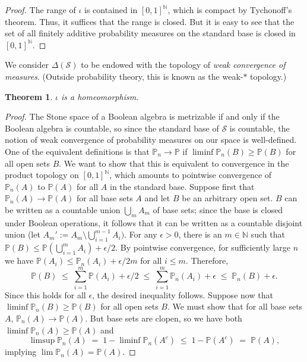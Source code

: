 \documentclass[12pt]{article}
\newcommand{\NN}{\mathbb{N}}
\newcommand{\cS}{\mathcal{S}}
\theoremstyle{plain}
\newtheorem{theorem}{Theorem}[subsection]
\theoremstyle{definition}
\theoremstyle{remark}
\begin{document}
\begin{proof}
The range of $\iota$ is contained in $[0,1]^\NN$, which is compact by Tychonoff's theorem. Thus, it suffices that the range is closed. But it is easy to see that the set of all finitely additive probability measures on the standard base is closed in $[0,1]^\NN$.
\end{proof}
We consider $\Delta(\cS)$ to be endowed with the topology of \emph{weak convergence of measures}. (Outside probability theory, this is known as the weak-$*$ topology.)
\begin{theorem}
$\iota$ is a homeomorphism.
\end{theorem}
\begin{proof}
The Stone space of a Boolean algebra is metrizable if and only if the Boolean algebra is countable, so since the standard base of $\cS$ is countable, the notion of weak convergence of probability measures on our space is well-defined. One of the equivalent definitions is that $\mathbb{P}_n\to\mathbb{P}$ if $\liminf\mathbb{P}_n(B)\ge\mathbb{P}(B)$ for all open sets $B$. We want to show that this is equivalent to convergence in the product topology on $[0,1]^\NN$, which amounts to pointwise convergence of $\mathbb{P}_n(A)$ to $\mathbb{P}(A)$ for all $A$ in the standard base.
Suppose first that $\mathbb{P}_n(A)\to\mathbb{P}(A)$ for all base sets $A$ and let $B$ be an arbitrary open set. $B$ can be written as a countable union $\textstyle\bigcup_m A_m$ of base sets; since the base is closed under Boolean operations, it follows that it can be written as a countable disjoint union (let $\textstyle A_m' := A_m\setminus\bigcup_{i=1}^{m-1}A_i)$. For any $\epsilon>0$, there is an $m\in\mathbb{N}$ such that $\textstyle\mathbb{P}(B)\le\mathbb{P}(\bigcup_{i=1}^m A_i)+\epsilon/2$. By pointwise convergence, for sufficiently large $n$ we have $\mathbb{P}(A_i)\le\mathbb{P}_n(A_i) + \epsilon/2m$ for all $i\le m$. Therefore,
\[
\textstyle\mathbb{P}(B)\;\le\;\sum_{i=1}^m\mathbb{P}(A_i)+\epsilon/2\;\le\;\sum_{i=1}^m\mathbb{P}_n(A_i) + \epsilon\;\le\;\mathbb{P}_n(B)+\epsilon.
\]
Since this holds for all $\epsilon$, the desired inequality follows.
Suppose now that $\liminf\mathbb{P}_n(B)\ge\mathbb{P}(B)$ for all open sets $B$. We must show that for all base sets $A$, $\mathbb{P}_n(A)\to\mathbb{P}(A)$. But base sets are clopen, so we have both $\liminf\mathbb{P}_n(A)\ge\mathbb{P}(A)$ and
\[
\limsup\mathbb{P}_n(A) \;=\; 1-\liminf\mathbb{P}_n(A^c) \;\le\; 1 - \mathbb{P}(A^c) \;=\; \mathbb{P}(A),
\]
implying $\lim\mathbb{P}_n(A) = \mathbb{P}(A)$.
\end{proof}
\end{document}
